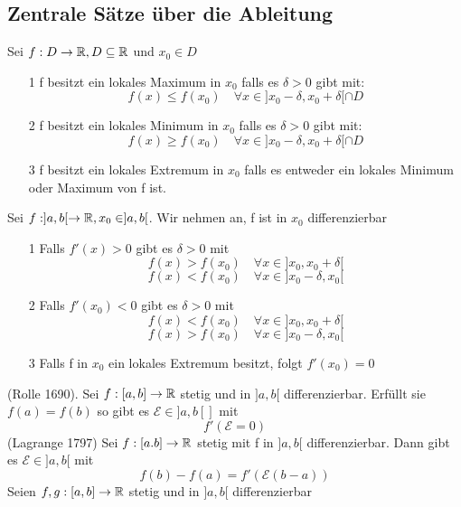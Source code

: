 \subsection{Zentrale Sätze über die Ableitung}
 Sei \(f: D \rightarrow \mathbb{R}, D \subseteq \mathbb{R} \) und \(x_0 \in D\)
\begin{enumerate}
    \item [1] f besitzt ein lokales Maximum in \(x_0\) falls es \( \delta > 0 \) gibt mit:
    \[f(x) \leq f(x_0) \quad \forall x \in ]x_0 - \delta, x_0 + \delta [ \cap D\]
    \item [2] f besitzt ein lokales Minimum in \(x_0\) falls es \( \delta > 0 \) gibt mit:
    \[f(x) \geq f(x_0) \quad \forall x \in ]x_0 - \delta, x_0 + \delta[ \cap D\]
    \item [3] f besitzt ein lokales Extremum in \(x_0\) falls es entweder ein lokales Minimum oder Maximum von f ist.
\end{enumerate}
 Sei \(f: ]a,b[ \rightarrow \mathbb{R}, x_0 \in ]a,b[\). Wir nehmen an, f ist in \(x_0\) differenzierbar
\begin{enumerate}
    \item [1] Falls \(f'(x) > 0\) gibt es \( \delta > 0\) mit
    \[f(x) > f(x_0) \quad \forall x \in ]x_0,x_0 + \delta [\]
    \[f(x) < f(x_0) \quad \forall x \in ]x_0 - \delta ,x_0[\]
    \item [2] Falls \(f'(x_0) < 0 \) gibt es \( \delta > 0\) mit
    \[f(x) < f(x_0) \quad \forall x \in ]x_0,x_0 + \delta [\]
    \[f(x) > f(x_0) \quad \forall x \in ]x_0 - \delta ,x_0[\]
    \item [3] Falls f in \(x_0\) ein lokales Extremum besitzt, folgt \(f'(x_0) = 0\)
\end{enumerate}
 (Rolle 1690). Sei \(f: [a,b] \rightarrow \mathbb{R} \) stetig und in \(]a,b[\) differenzierbar. Erfüllt sie \(f(a) = f(b)\) so gibt es \(\mathcal{E} \in ]a,b[]\) mit 
\[f'(\mathcal{E} = 0)\]
 (Lagrange 1797) Sei \(f : [a.b] \rightarrow \mathbb{R} \) stetig mit f in \(]a,b[\) differenzierbar. Dann gibt es \( \mathcal{E} \in ]a,b[ \) mit 
\[f(b) - f(a) = f'(\mathcal{E} (b-a))\]
 Seien \(f,g : [a,b] \rightarrow \mathbb{R}\) stetig und in \(]a,b[\) differenzierbar
